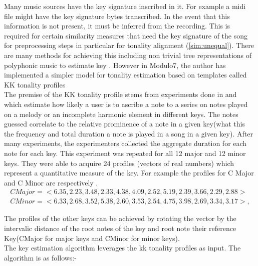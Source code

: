 \noindent Many music sources have the key signature inscribed in it. For example a midi file might have the key signature bytes transcribed. In the event that this information is not present, it must be inferred from the recording. This is required for certain similarity measures that need the key signature of the song for preprocessing steps  in particular for tonality alignment (\ref{sim:unequal}). There are many methods for achieving this including non trivial tree representations of polyphonic music to estimate key \cite{treemodel}. However in Modulo7, the author has implemented a simpler model for tonality estimation based on templates called KK tonality profiles \cite{kkTonalityKeyFinding} \\

\noindent The premise of the KK tonality profile stems from experiments done in \cite{kkTonalityKeyFinding} and \cite{kkcognitive} which estimate how likely a user is to ascribe a note to a series on notes played on a melody or an incomplete harmonic element in different keys. The notes guessed correlate to the relative prominence of a note in a given key(what this the frequency and total duration a note is played in a song in a given key). After many experiments, the experimenters collected the aggregate duration for each note for each key. This experiment was  repeated for all 12 major and 12 minor keys. They were able to acquire 24 profiles (vectors of real numbers) which represent a quantitative measure of the key. For example the profiles for C Major and C Minor are respectively \cite{kkcognitive}.
\begin{equation} \label{kkprofiles}
\begin{aligned}
  CMajor = <6.35, 2.23, 3.48, 2.33, 4.38, 4.09, 2.52, 5.19, 2.39, 3.66, 2.29, 2.88> \\
  CMinor = <6.33, 2.68, 3.52, 5.38, 2.60, 3.53, 2.54, 4.75, 3.98, 2.69, 3.34, 3.17>, 
\end{aligned}
\end{equation}

\noindent The profiles of the other keys can be achieved by rotating the vector by the intervalic distance of the root notes of the key and root note their reference Key(CMajor for major keys and CMinor for minor keys). \\

\noindent The key estimation algorithm leverages the kk tonality profiles as input. The algorithm is as follows:-

